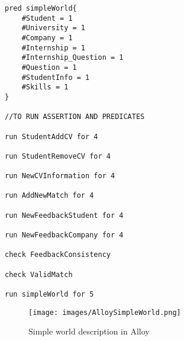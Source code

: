 \begin{lstlisting}
pred simpleWorld{
	#Student = 1
	#University = 1
	#Company = 1
	#Internship = 1
	#Internship_Question = 1
	#Question = 1
	#StudentInfo = 1
	#Skills = 1
}

//TO RUN ASSERTION AND PREDICATES

run StudentAddCV for 4

run StudentRemoveCV for 4

run NewCVInformation for 4

run AddNewMatch for 4

run NewFeedbackStudent for 4

run NewFeedbackCompany for 4

check FeedbackConsistency

check ValidMatch

run simpleWorld for 5

\end{lstlisting}



\begin{figure}
    \centering
    \texttt{[image: images/AlloySimpleWorld.png]}
    \caption{Simple world description in Alloy}
    \label{fig:simple-world}
\end{figure}



\pagebreak

